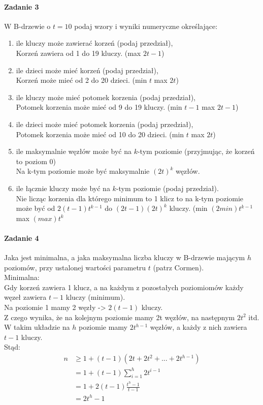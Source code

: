 \documentclass[18pt]{extarticle}
\begin{document}
\paragraph{Zadanie 3} W B-drzewie o $t=10$ podaj wzory i wyniki numeryczne określające:
\begin{enumerate}[label=(\alph*)]
    \item ile kluczy może zawierać korzeń (podaj przedział), \\
    Korzeń zawiera od 1 do 19 kluczy. (max $2t-1$)
    \item ile dzieci może mieć korzeń (podaj przedział), \\
    Korzeń może mieć od 2 do 20 dzieci. (min $t$ max $2t$)
    \item ile kluczy może mieć potomek korzenia (podaj przedział), \\
    Potomek korzenia może mieć od 9 do 19 kluczy. (min $t-1$ max $2t-1$)
    \item ile dzieci może mieć potomek korzenia (podaj przedział), \\
    Potomek korzenia może mieć od 10 do 20 dzieci. (min $t$ max $2t$)
    \item ile maksymalnie węzłów może być na $k$-tym poziomie (przyjmując, że korzeń to poziom $0$) \\
    Na k-tym poziomie może być maksymalnie $(2t)^k$ węzłów.
    \item ile łącznie kluczy może być na $k$-tym poziomie (podaj przedział). \\
    Nie licząc korzenia dla którego minimum to 1 klicz to na k-tym poziomie może być od $2(t-1)t^{k-1}$ do $(2t-1)(2t)^{k}$ kluczy. (min $(2min)t^{k-1}$ max $(max)t^{k}$
\end{enumerate}

\paragraph{Zadanie 4} Jaka jest minimalna, a jaka maksymalna liczba kluczy w B-drzewie mającym $h$ poziomów, przy ustalonej wartości parametru $t$ (patrz Cormen). \\

Minimalna: \\
Gdy korzeń zawiera 1 klucz, a na każdym z pozostałych poziomiomów każdy węzeł zawiera $t-1$ kluczy (minimum). \\
Na poziomie 1 mamy 2 węzły -> $2(t-1)$ kluczy. \\
Z czego wynika, że na kolejnym poziomie mamy 2t węzłów, na następnym $2t^2$ itd. \\
W takim układzie na $h$ poziomie mamy $2t^{h-1}$ węzłów, a każdy z nich zawiera $t-1$ kluczy. \\
Stąd: \\
\begin{align*}
    n &\geq 1 + (t-1)(2t + 2t^2 + ... + 2t^{h-1}) \\
    &= 1 + (t-1)\sum_{i=1}^{h}2t^{i-1} \\
    &= 1 + 2(t-1)\frac{t^h-1}{t-1} \\
    &= 2t^h - 1
\end{align*}
\end{document}
